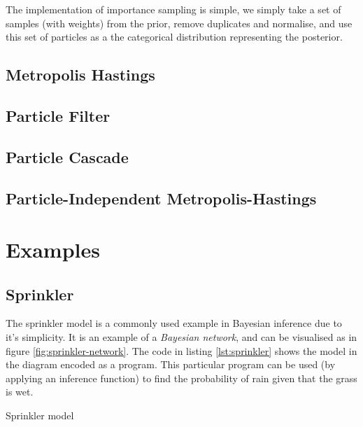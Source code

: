 The implementation of importance sampling is simple, we simply take a set of samples (with weights) from the prior, remove duplicates and normalise, and use this set of particles as a the categorical distribution representing the posterior. 


\subsection{Metropolis Hastings} \label{sec:mh}

\subsection{Particle Filter} \label{sec:pf}

\subsection{Particle Cascade} \label{sec:pc}

\subsection{Particle-Independent Metropolis-Hastings} \label{sec:pimh}


\section{Examples}

\subsection{Sprinkler}
The sprinkler model is a commonly used example in Bayesian inference due to it's simplicity. It is an example of a \textit{Bayesian network}, and can be visualised as in figure \ref{fig:sprinkler-network}. The code in listing \ref{lst:sprinkler} shows the model in the diagram encoded as a program. This particular program can be used (by applying an inference function) to find the probability of rain given that the grass is wet.

\begin{listing}[!ht]
	\caption{Sprinkler model}
	\label{lst:sprinkler}
\end{listing}



